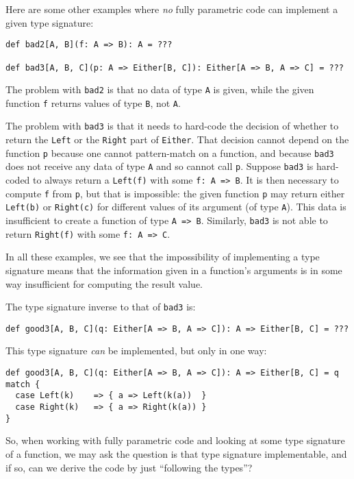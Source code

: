 Here are some other examples where \emph{no} fully parametric code
can implement a given type signature: 
\begin{lstlisting}
def bad2[A, B](f: A => B): A = ???

def bad3[A, B, C](p: A => Either[B, C]): Either[A => B, A => C] = ???
\end{lstlisting}

The problem with \lstinline!bad2! is that no data of type \lstinline!A!
is given, while the given function \lstinline!f! returns values of
type \lstinline!B!, not \lstinline!A!. 

The problem with \lstinline!bad3! is that it needs to hard-code the
decision of whether to return the \lstinline!Left! or the \lstinline!Right!
part of \lstinline!Either!. That decision cannot depend on the function
\lstinline!p! because one cannot pattern-match on a function, and
because \lstinline!bad3! does not receive any data of type \lstinline!A!
and so cannot call \lstinline!p!. Suppose \lstinline!bad3! is hard-coded
to always return a \lstinline!Left(f)! with some \lstinline!f: A => B!.
It is then necessary to compute \lstinline!f! from \lstinline!p!,
but that is impossible: the given function \lstinline!p! may return
either \lstinline!Left(b)! or \lstinline!Right(c)! for different
values of its argument (of type \lstinline!A!). This data is insufficient
to create a function of type \lstinline!A => B!. Similarly, \lstinline!bad3!
is not able to return \lstinline!Right(f)! with some \lstinline!f: A => C!.

In all these examples, we see that the impossibility of implementing
a type signature means that the information given in a function\textsf{'}s
arguments is in some way insufficient for computing the result value.

The type signature inverse to that of \lstinline!bad3! is:
\begin{lstlisting}
def good3[A, B, C](q: Either[A => B, A => C]): A => Either[B, C] = ???
\end{lstlisting}
This type signature \emph{can} be implemented, but only in one way:
\begin{lstlisting}
def good3[A, B, C](q: Either[A => B, A => C]): A => Either[B, C] = q match {
  case Left(k)    => { a => Left(k(a))  }
  case Right(k)   => { a => Right(k(a)) }
}
\end{lstlisting}

So, when working with fully parametric code and looking at some type
signature of a function, we may ask the question \textemdash{} is
that type signature implementable, and if so, can we derive the code
by just \textsf{``}following the types\textsf{''}?

